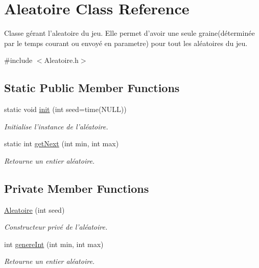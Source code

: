 \hypertarget{classAleatoire}{\section{Aleatoire Class Reference}
\label{classAleatoire}
}


Classe gérant l'aleatoire du jeu. Elle permet d'avoir une seule graine(déterminée par le temps courant ou envoyé en parametre) pour tout les aléatoires du jeu.  




{\ttfamily \#include $<$Aleatoire.\-h$>$}

\subsection*{Static Public Member Functions}
\begin{DoxyCompactItemize}
\item 
static void \hyperlink{classAleatoire_a742971fbe2a5008c650f46b8b951e82f}{init} (int seed=time(N\-U\-L\-L))
\begin{DoxyCompactList}\small\item\em Initialise l'instance de l'aléatoire. \end{DoxyCompactList}\item 
static int \hyperlink{classAleatoire_abf148ef04a9cbce6240be7f532dcbbff}{get\-Next} (int min, int max)
\begin{DoxyCompactList}\small\item\em Retourne un entier aléatoire. \end{DoxyCompactList}\end{DoxyCompactItemize}
\subsection*{Private Member Functions}
\begin{DoxyCompactItemize}
\item 
\hyperlink{classAleatoire_a9d1fd69758c98ebeabd584e45d05b223}{Aleatoire} (int seed)
\begin{DoxyCompactList}\small\item\em Constructeur privé de l'aléatoire. \end{DoxyCompactList}\item 
int \hyperlink{classAleatoire_a7e261155fd493a94e012d66f35b6211b}{genere\-Int} (int min, int max)
\begin{DoxyCompactList}\small\item\em Retourne un entier aléatoire. \end{DoxyCompactList}\end{DoxyCompactItemize}
